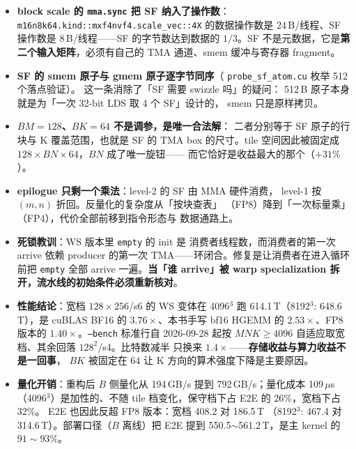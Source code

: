 \begin{itemize}[itemsep=2pt,topsep=3pt]
  \item \textbf{block scale 的 \texttt{mma.sync} 把 SF 纳入了操作数}：
        \texttt{m16n8k64.kind::mxf4nvf4.scale\_vec::4X} 的数据操作数是
        24\,B/线程、SF 操作数是 8\,B/线程——SF 的字节数达到数据的
        $1/3$。SF 不是元数据，它是\textbf{第二个输入矩阵}，必须有自己的
        TMA 通道、smem 缓冲与寄存器 fragment。
  \item \textbf{SF 的 smem 原子与 gmem 原子逐字节同序}（
        \texttt{probe\_sf\_atom.cu} 枚举 512 个落点验证）。
        这一条消除了「SF 需要 swizzle 吗」的疑问：
        512\,B 原子本身就是为「一次 32-bit LDS 取 4 个 SF」设计的，
        smem 只是原样拷贝。
  \item \textbf{$BM{=}128$、$BK{=}64$ 不是调参，是唯一合法解}：
        二者分别等于 SF 原子的行块与 K 覆盖范围，也就是 SF 的
        TMA box 的尺寸。tile 空间因此被固定成
        $128\times BN\times64$，$BN$ 成了唯一旋钮——
        而它恰好是收益最大的那个（$+31\%$）。
  \item \textbf{epilogue 只剩一个乘法}：level-2 的 SF 由 MMA 硬件消费，
        level-1 按 $(m,n)$ 折回。反量化的复杂度从「按块查表」
        （FP8）降到「一次标量乘」（FP4），代价全部前移到指令形态与
        数据通路上。
  \item \textbf{死锁教训}：WS 版本里 \texttt{empty} 的 init 是
        消费者线程数，而消费者的第一次 arrive 依赖 producer 的第一次
        TMA——环闭合。修复是让消费者在进入循环前把 \texttt{empty}
        全部 arrive 一遍。\textbf{当「谁 arrive」被 warp specialization
        拆开，流水线的初始条件必须重新核对}。
  \item \textbf{性能结论}：宽档 $128\times256$/s6 的 WS 变体在 4096$^3$
        跑 614.1\,T（8192$^3$: 648.6\,T），是 cuBLAS BF16 的
        $3.76\times$、本书手写 bf16 HGEMM 的 $2.53\times$、FP8 版本的
        $1.40\times$。\texttt{--bench} 标准行自 2026-09-28 起按
        $MNK\ge4096$ 自适应取宽档、其余回落 $128^2$/s4。比特数减半
        只换来 $1.4\times$——\textbf{存储收益与算力收益不是一回事}，
        $BK$ 被固定在 64 让 K 方向的算术强度下降是主要原因。
  \item \textbf{量化开销}：重构后 $B$ 侧量化从 194\,GB/s 提到
        792\,GB/s；量化成本 109\,$\mu$s（4096$^3$）是加性的、不随
        tile 档变化，保守档下占 E2E 的 26\%，宽档下占 32\%。
        E2E 也因此反超 FP8 版本：宽档 408.2 对 186.5\,T
        （8192$^3$: 467.4 对 314.6\,T）。部署口径（$B$ 离线）把 E2E
        提到 550.5$\sim$561.2\,T，是主 kernel 的 $91\sim93\%$。
\end{itemize}

